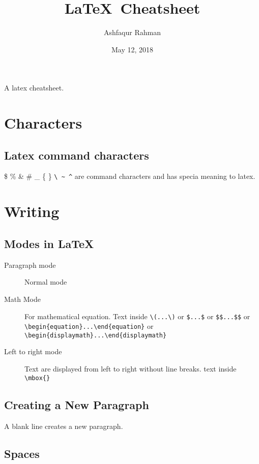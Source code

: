 \documentclass[11pt]{article}
\title{\LaTeX\ Cheatsheet}
\author{Ashfaqur Rahman}
\date{May 12, 2018}
\begin{document}
\maketitle

A latex cheatsheet.

\section{Characters}


\subsection{Latex command characters}

\$ \% \& \# \_ \{ \} \verb=\ ~ ^= are command characters and has specia meaning to latex.

\section{Writing}

\subsection{Modes in \LaTeX}

\begin{description}
	\item[Paragraph mode] Normal mode
	\item[Math Mode] For mathematical equation. Text inside \verb=\(...\)= or \verb=$...$= or \verb=$$...$$= or \verb=\begin{equation}...\end{equation}= or \verb=\begin{displaymath}...\end{displaymath}=
	\item[Left to right mode] Text are displayed from left to right without line breaks. text inside \verb=\mbox{}=
\end{description}

\subsection{Creating a New Paragraph}

A blank line creates a new paragraph.

\subsection{Spaces}
\end{document}
